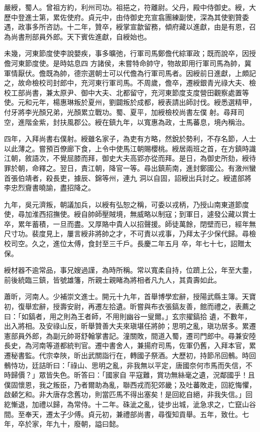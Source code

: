 \begin{pinyinscope}
 嚴綬，蜀人。曾祖方約，利州司功。祖挹之，符離尉。父丹，殿中侍御史。綬，大歷中登進士第，累佐使府。貞元中，由侍御史充宣翕團練副使，深為其使劉贊委遇，政事多所咨訪。十二年，贊卒，綬掌宣歙留務，傾府藏以進獻，由是有恩，召為尚書刑部員外郎。天下賓佐進獻，自綬始也。



 未幾，河東節度使李說嬰疾，事多曠弛，行軍司馬鄭儋代綜軍政；既而說卒，因授儋河東節度使。是時姑息四
 方諸侯，未嘗特命帥守，物故即用行軍司馬為帥，冀軍情厭伏。儋既為帥，德宗選朝士可以代儋為行軍司馬者。因綬前日進獻，上頗記之，故命檢校司封郎中，充河東行軍司馬。不周歲，儋卒，遷綬銀青光祿大夫、檢校工部尚書，兼太原尹、御中大夫、北都留守，充河東節度支度營田觀察處置等使。元和元年，楊惠琳叛於夏州，劉闢叛於成都，綬表請出師討伐。綬悉選精甲，付牙將李光顏兄弟，光顏累立戰功。蜀、夏平，加綬檢校尚書左僕
 射。尋拜司空，進階金紫，封扶風郡公。綬在鎮九年，以寬惠為政，士馬蕃息，境內稱治。



 四年，入拜尚書右僕射。綬雖名家子，為吏有方略，然銳於勢利，不存名節，人士以此薄之。嘗預百僚廊下食，上令中使馬江朝賜櫻桃。綬居兩班之首，在方鎮時識江朝，敘語次，不覺屈膝而拜，御史大夫高郢亦從而拜。是日，為御史所劾，綬待罪於朝，命釋之。翌日，責江朝，降官一等。尋出鎮荊南，進封鄭國公。有漵州蠻首張伯靖者，殺長吏，據辰、錦等州，連九
 洞以自固，詔綬出兵討之。綬遣部將李忠烈齎書曉諭，盡招降之。



 九年，吳元濟叛，朝議加兵，以綬有弘恕之稱，可委以戎柄，乃授山南東道節度使，尋加淮西招撫使。綬自帥師壓賊境，無威略以制寇；到軍日，遽發公藏以賞士卒，累年蓄積，一旦而盡。又厚賂中貴人以招聲援。師徒萬餘，閉壁而已，經年無尺寸功。裴度見上，屢言綬非將帥之才，不可責以戎事，乃拜太子少保代歸。尋檢校司空。久之，進位太傅，食封至三千戶。長慶二年五月
 卒，年七十七，詔贈太保。



 綬材器不逾常品，事兄嫂過謹，為時所稱。常以寬柔自持，位躋上公，年至大耋，前後統臨三鎮，皆號雄籓，所親士親睹為將相者凡九人，其貴壽如此。



 蕭昕，河南人。少補崇文進士。開元十九年，首舉博學宏辭，授陽武縣主簿。天寶初，復舉宏辭，授壽安尉，再遷左拾遺。昕嘗與布衣張鎬友善，館而禮之，表薦之曰：「如鎬者，用之則為王者師，不用則幽谷一叟爾。」玄宗擢鎬拾
 遺，不數年，出入將相。及安祿山反，昕舉贊善大夫來瑱堪任將帥；思明之亂，瑱功居多。累遷憲部員外郎，為副元帥哥舒翰掌書記。潼關敗，間道入蜀，遷司門郎中。尋兼安陸長史，為河南等道都統判官。遷中書舍人，兼揚府司馬，佐軍仍舊，入拜本官，累遷秘書監。代宗幸陜，昕出武關詣行在，轉國子祭酒。大歷初，持節吊回鶻。時回鶻恃功，廷詰昕曰：「祿山、思明之亂，非我無以平定，唐國奈何市馬而失信，不時歸價？」眾皆失色。昕答曰：「國家自
 平寇難，賞功無絲毫之遺，況鄰國乎！且僕固懷恩，我之叛臣，乃者爾助為亂，聯西戎而犯郊畿；及吐蕃敗走，回紇悔懼，啟顙乞和。非大唐存念舊功，則當匹馬不得出塞矣！是回紇自絕，非我失信。」回紇慚退，加禮以歸，為常侍。十二年。硃泚之亂，徒步出城，泚急求之，亡竄山谷間。至奉天，遷太子少傅。貞元初，兼禮部尚書，尋復知貢舉。五年，致仕。七年，卒於家，年九十，廢朝，謚曰懿。




\end{pinyinscope}
